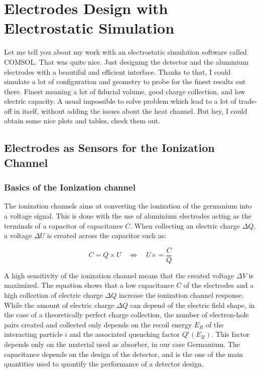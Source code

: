
\chapter{Electrodes Design with Electrostatic Simulation} %

\label{ChapterElectrodes} %


Let me tell you about my work with an electrostatic simulation software called COMSOL.
That was quite nice. Just designing the detector and the aluminium electrodes with a beautiful and efficient interface.
Thanks to that, I could simulate a lot of configuration and geometry to probe for the finest results out there.
Finest meaning a lot of fiducial volume, good charge collection, and low electric capacity.
A usual impossible to solve problem which lead to a lot of trade-off in itself, without adding the issues about the heat channel.
But hey, I could obtain some nice plots and tables, check them out.


\section{Electrodes as Sensors for the Ionization Channel}

\subsection{Basics of the Ionization channel}

The ionization channels aims at converting the ionization of the germanium into a voltage signal.
This is done with the use of aluminium electrodes acting as the terminals of a capacitor of capacitance $C$. When collecting an electric charge $\Delta Q$, a voltage $\Delta U$ is created across the capacitor such as:

\begin{equation}
C = Q \times U \quad \Leftrightarrow \quad U \times = \frac{C}{Q}
\label{eq:capacitor-basic}
\end{equation}

A high sensitivity of the ionization channel means that the created voltage $\Delta V$ is maximized. The equation \label{eq:capacitor-basic} shows that a low capacitance $C$ of the electrodes and a high collection of electric charge $\Delta Q$ increase the ionization channel response. While the amount of electric charge $\Delta Q$ can depend of the electric field shape, in the case of a theoretically perfect charge collection, the number of electron-hole pairs created and collected only depends on the recoil energy $E_R$ of the interacting particle $i$ and the associated quenching factor $Q^i(E_R)$. This factor depends only on the material used as absorber, in our case Germanium.
The capacitance depends on the design of the detector, and is the one of the main quantities used to quantify the performance of a detector design.


